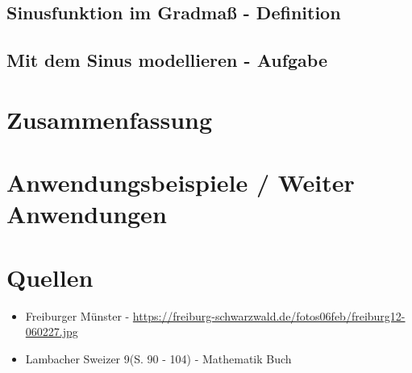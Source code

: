 \documentclass[12pt,a4paper]{article}
\begin{document}
\subsection{Sinusfunktion im Gradmaß - Definition}
\subsection{Mit dem Sinus modellieren - Aufgabe}

\section{Zusammenfassung}

\section{Anwendungsbeispiele / Weiter Anwendungen}

\newpage
\section{Quellen}
\begin{itemize}
	\item Freiburger Münster - \url{https://freiburg-schwarzwald.de/fotos06feb/freiburg12-060227.jpg}
	\item Lambacher Sweizer 9(S. 90 - 104) - Mathematik Buch
\end{itemize}
\end{document}
